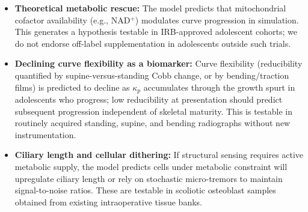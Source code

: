 \begin{itemize}
    \item \textbf{Theoretical metabolic rescue:} The model predicts that mitochondrial cofactor availability (e.g., NAD$^+$) modulates curve progression in simulation. This generates a hypothesis testable in IRB-approved adolescent cohorts; we do not endorse off-label supplementation in adolescents outside such trials.
    \item \textbf{Declining curve flexibility as a biomarker:} Curve flexibility (reducibility quantified by supine-versus-standing Cobb change, or by bending/traction films) is predicted to decline as $\kappa_p$ accumulates through the growth spurt in adolescents who progress; low reducibility at presentation should predict subsequent progression independent of skeletal maturity. This is testable in routinely acquired standing, supine, and bending radiographs without new instrumentation.
    \item \textbf{Ciliary length and cellular dithering:} If structural sensing requires active metabolic supply, the model predicts cells under metabolic constraint will upregulate ciliary length or rely on stochastic micro-tremors to maintain signal-to-noise ratios. These are testable in scoliotic osteoblast samples obtained from existing intraoperative tissue banks.
\end{itemize}
